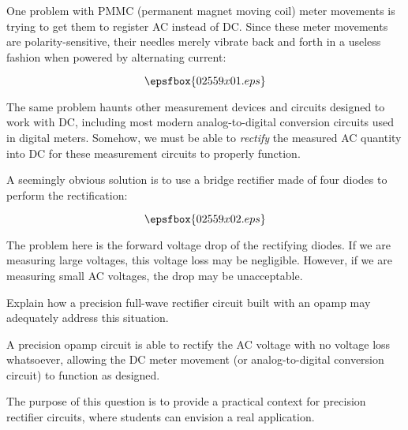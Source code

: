 

One problem with PMMC (permanent magnet moving coil) meter movements is trying to get them to register AC instead of DC.  Since these meter movements are polarity-sensitive, their needles merely vibrate back and forth in a useless fashion when powered by alternating current:

$$\epsfbox{02559x01.eps}$$

The same problem haunts other measurement devices and circuits designed to work with DC, including most modern analog-to-digital conversion circuits used in digital meters.  Somehow, we must be able to {\it rectify} the measured AC quantity into DC for these measurement circuits to properly function.

A seemingly obvious solution is to use a bridge rectifier made of four diodes to perform the rectification:

$$\epsfbox{02559x02.eps}$$

The problem here is the forward voltage drop of the rectifying diodes.  If we are measuring large voltages, this voltage loss may be negligible.  However, if we are measuring small AC voltages, the drop may be unacceptable.

Explain how a precision full-wave rectifier circuit built with an opamp may adequately address this situation.







A precision opamp circuit is able to rectify the AC voltage with no voltage loss whatsoever, allowing the DC meter movement (or analog-to-digital conversion circuit) to function as designed.







The purpose of this question is to provide a practical context for precision rectifier circuits, where students can envision a real application.





